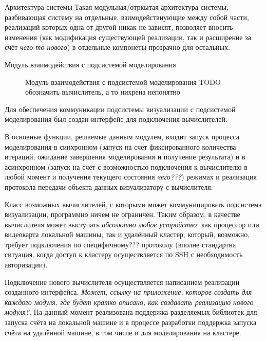 \documentclass[a4paper,12pt]{extarticle}
\begin{document}
\begin{section}{Архитектура системы}
Такая модульная/отркытая архитектура системы, разбивающая систему на отдельные, взимодействиующие между собой части, реализаций которых одна от другой никак не зависят, позволяет вносить изменения (как модификация существующей реализации, так и расширение за счёт \textit{чего-то нового}) в отдельные компонеты прозрачно для остальных.

\begin{subsection}{Модуль взаимодействия с подсистемой моделирования}
    \begin{figure}[h]
        \caption{Модуль взаимодействия с подсистемой моделирования TODO обозначить вычислитель, а то нихрена непонятно}
        \label{ris:architecture-calc}
    \end{figure}
    
    Для обеспечения коммуникации подсистемы визуализации с подсистемой моделирования был создан интерфейс для подключения вычислителей.

    В основные функции, решаемые данным модулем, входит запуск процесса моделирования в синхронном (запуск на счёт фиксированного количества итераций, ожидание завершения моделирования и получение результата) и в асинхронном (запуск на счёт с возможностью подключения к вычислителю в любой момент и получения текущего состояния \textit{чего???}) режимах и реализация протокола передачи объекта данных визуализатору с вычислителя.

    Класс возможных вычислителей, с которыми может коммуницировать подсистема визуализации, программно ничем не ограничен. Таким образом, в качестве вычислителя может выступать \textit{абсолютно любое устройство}: как процессор или видеокарта локальной машины, так и удалённый кластер, который, возможно, требует подключения по специфичному??? протоколу (вполне стандартна ситуация, когда доступ к кластеру осуществляется по SSH с необходимость авторизации).

    Подключение нового вычислителя осуществляется написанием реализации созданного интерфейса.
    \textit{Может, ссылку на приложение, которое создать для каждого модуля, где будет кратко описано, как создавать реализацию нового модуля?}. На данный момент реализована поддержка разделяемых библиотек для запуска счёта на локальной машине и в процессе разработки поддержка запуска счёта на удалённой машине, в том числе и для моделирования на кластере.


\end{subsection}
\end{section}
\end{document}
